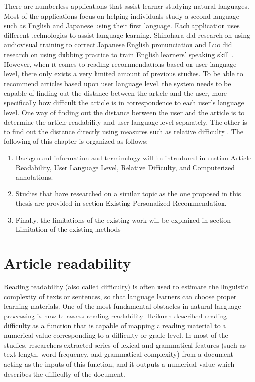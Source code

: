 There are numberless applications that assist learner studying natural languages. Most of the applications focus on helping individuals study a second language such as English and Japanese using their first language. Each application uses different technologies to assist language learning. Shinohara did research on using audiovisual training to correct Japanese English pronunciation \cite{Shinohara2016} and Luo did research on using dubbing practice to train English learners' speaking skill \cite{Luo2016}. However, when it comes to reading recommendations based on user language level, there only exists a very limited amount of previous studies. To be able to recommend articles based upon user language level, the system needs to be capable of finding out the distance between the article and the user, more specifically how difficult the article is in correspondence to each user's language level. One way of finding out the distance between the user and the article is to determine the article readability and user language level separately. The other is to find out the distance directly using measures such as relative difficulty \cite{Carver1994}. The following of this chapter is organized as follows:
\begin{enumerate}
  \item Background information and terminology will be introduced in section Article Readability, User Language Level, Relative Difficulty, and Computerized annotations.
  \item Studies that have researched on a similar topic as the one proposed in this thesis are provided in section Existing Personalized Recommendation.
  \item Finally, the limitations of the existing work will be explained in section Limitation of the existing methods
\end{enumerate}

\section{Article readability}

Reading readability (also called difficulty) is often used to estimate the linguistic complexity of texts or sentences, so that language learners can choose proper learning materials. One of the most fundamental obstacles in natural language processing is how to assess reading readability. Heilman \cite{Heilman2007} described reading difficulty as a function that is capable of mapping a reading material to a numerical value corresponding to a difficulty or grade level. In most of the studies, researchers extracted series of lexical and grammatical features (such as text length, word frequency, and grammatical complexity) from a document acting as the inputs of this function, and it outputs a numerical value which describes the difficulty of the document.

